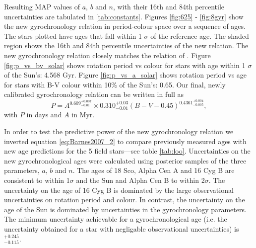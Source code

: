 \documentclass[10pt,preprint]{aastex}
\newcommand{\gyroa}{0.310}
\newcommand{\aerrp}{0.03}
\newcommand{\aerrm}{0.01}
\newcommand{\gyron}{0.609}
\newcommand{\nerrp}{0.007}
\newcommand{\nerrm}{0.01}
\newcommand{\gyrob}{0.4361}
\newcommand{\berrp}{0.004}
\newcommand{\berrm}{0.005}
\begin{document}
Resulting MAP values of $a$, $b$ and $n$, with their 16th and 84th percentile uncertainties are tabulated in \ref{tab:constants}.
Figures \ref{fig:625} - \ref{fig:8gyr} show the new gyrochronology relation in period-colour space over a sequence of ages.
The stars plotted have ages that fall within 1 $\sigma$ of the reference age.
The shaded region shows the 16th and 84th percentile uncertainties of the new relation.
The new gyrochronology relation closely matches the relation of \citet{Mamajek2008}.
Figure \ref{fig:p_vs_bv_solar} shows rotation period vs colour for stars with age within 1 $\sigma$ of the Sun's: 4.568 Gyr.
Figure \ref{fig:p_vs_a_solar} shows rotation period vs age for stars with B-V colour within 10\% of the Sun's: 0.65.
Our final, newly calibrated gyrochronology relation can be written in full as
\begin{equation}
	P = A^{\gyron^{+\nerrp}_{-\nerrm}} \times \gyroa^{+\aerrp}_{-\aerrm}(B-V-0.45)^{\gyrob^{+\berrp}_{-\berrm}},
\label{eq:Barnes2007_2}
\end{equation}
with $P$ in days and $A$ in Myr.

In order to test the predictive power of the new gyrochronology relation we inverted equation \ref{eq:Barnes2007_2}
to compare previously measured ages with new age predictions for the 5 field stars---see table \ref{tab:loo}.
Uncertainties on the new gyrochronological ages were calculated using posterior samples of the three parameters, $a$, $b$ and $n$.
The ages of 18 Sco, Alpha Cen A and 16 Cyg B are consistent to within 1$\sigma$ and the Sun and Alpha Cen B to within 2$\sigma$.
The uncertainty on the age of 16 Cyg B is dominated by the large observational uncertainties on rotation period and colour.
In contrast, the uncertainty on the age of the Sun is dominated by uncertainties in the gyrochronology parameters.
The minimum uncertainty achievable for a gyrochronological age (i.e. the uncertainty obtained for a star with negligable observational uncertainties) is $^{+0.245}_{-0.115}$.
\end{document}
